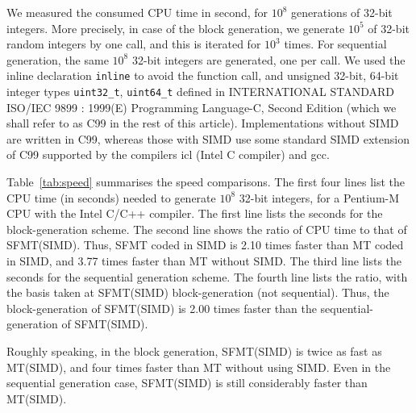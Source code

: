\documentclass{svmult}
\begin{document}
We measured the consumed CPU time in second, 
for $10^8$ generations of 32-bit integers. More precisely,
in case of the block generation, we generate $10^5$
of 32-bit random integers by one call, and this is iterated
for $10^3$ times. 
For sequential generation, the same $10^8$
 32-bit integers are generated, one per call.
We used the inline declaration
{\tt inline} to avoid the function call,
and unsigned 32-bit, 64-bit integer types 
{\tt uint32\_t}, {\tt uint64\_t} defined in 
INTERNATIONAL STANDARD ISO/IEC 9899 : 1999(E) 
Programming Language-C, Second Edition
(which we shall refer to as C99 in the rest of this article).
Implementations without SIMD are written in C99,
whereas those with SIMD use
some standard SIMD extension of C99 supported by 
the compilers icl (Intel C compiler) and gcc.

Table~\ref{tab:speed} summarises the speed comparisons.
 The first four lines list the CPU time
(in seconds) needed to generate $10^8$ 
32-bit integers, for a Pentium-M CPU with the Intel C/C++
compiler. The first line lists the seconds for the
block-generation scheme. The second line shows the 
ratio of CPU time to that of 
SFMT(SIMD). Thus, SFMT coded in SIMD is 2.10 times
faster than MT coded in SIMD, and 3.77 times faster
than MT without SIMD. The third line lists the seconds
for the sequential generation scheme. The fourth line
lists the ratio, with the basis taken
at SFMT(SIMD) block-generation (not sequential). 
Thus, the block-generation of SFMT(SIMD) is 2.00 times
faster than the sequential-generation of SFMT(SIMD).

Roughly speaking, in the block generation, 
SFMT(SIMD) is twice as fast as MT(SIMD),
and four times faster than MT without using SIMD.
Even in the sequential generation case,
SFMT(SIMD) is still considerably faster than MT(SIMD).
\end{document}
